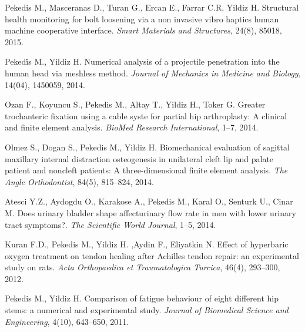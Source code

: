 \documentclass[10pt]{article}
\begin{document}
\begin{bibenum}
	\item Pekedis M., Masceranas D., Turan G., Ercan E., Farrar C.R, Yildiz H. Structural health monitoring for bolt
		 loosening via a non invasive vibro haptics human machine cooperative interface. 
		 \emph{Smart Materials and Structures}, 24(8), 85018, 2015.
		 
	\item Pekedi̇s M., Yildiz H. Numerical analysis of a projectile penetration
		into the human head via meshless method.
		\emph{Journal of Mechanics in Medicine and Biology}, 14(04), 1450059, 2014.
		
	\item Ozan F., Koyuncu S., Pekedis M., Altay T., Yildiz H., Toker G. Greater trochanteric
		fixation using a cable syste for partial hip arthroplasty: 
		A clinical and finite element analysis. 
		\emph{BioMed Research International}, 1--7, 2014.\\
		
	\item Olmez S., Dogan S., Pekedis M., Yildiz H. Biomechanical evaluation of sagittal maxillary internal distraction osteogenesis
		 in unilateral cleft lip and palate patient and noncleft patients: A three-dimensional finite element analysis.
		 \emph{The Angle Orthodontist}, 84(5), 815--824, 2014.
		 
	\item Atesci Y.Z., Aydogdu O., Karakose A., Pekedis M., Karal O., Senturk U., Cinar M. Does urinary bladder shape 
		affecturinary flow rate in men with lower urinary tract symptoms?. 
		\emph{The Scientific World Journal}, 1--5, 2014.\\
	
	\item Kuran F.D., Pekedis M., Yildiz H. ,Aydin F., Eliyatkin N. 	Effect of hyperbaric oxygen treatment on
		tendon healing after Achilles tendon repair: an experimental study on rats. 
		\emph{Acta Orthopaedica et Traumatologica Turcica}, 46(4), 293--300, 2012.
		
	\item Pekedis M., Yildiz H. Comparison of fatigue behaviour of eight different hip stems: a numerical and experimental study. 
		\emph{Journal of Biomedical Science and Engineering}, 4(10), 643--650, 2011.


\end{bibenum}
\end{document}
